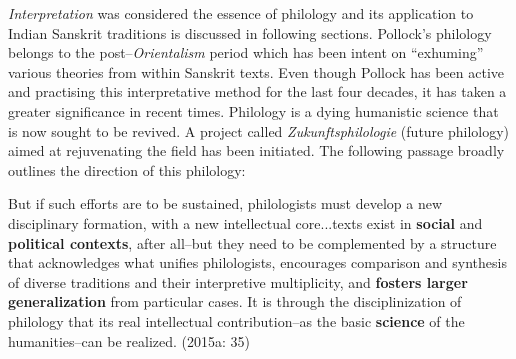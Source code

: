 \textit{Interpretation} was considered the essence of philology and its application to Indian Sanskrit traditions is discussed in following sections. Pollock’s philology belongs to the post–\textit{Orientalism} period which has been intent on “exhuming” various theories from within Sanskrit texts. Even though Pollock has been active and practising this interpretative method for the last four decades, it has taken a greater significance in recent times. Philology is a dying humanistic science that is now sought to be revived. A project called \textit{Zukunftsphilologie} (future philology) aimed at rejuvenating the field has been initiated. The following passage broadly outlines the direction of this philology:

\begin{myquote}
But if such efforts are to be sustained, philologists must develop a new disciplinary formation, with a new intellectual core...texts exist in \textbf{social} and \textbf{political contexts}, after all–but they need to be complemented by a structure that acknowledges what unifies philologists, encourages comparison and synthesis of diverse traditions and their interpretive multiplicity, and \textbf{fosters larger generalization} from particular cases. It is through the disciplinization of philology that its real intellectual contribution–as the basic \textbf{science} of the humanities–can be realized. (2015a: 35)
\end{myquote}

